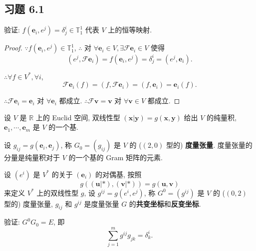\documentclass{ctexart}
\begin{document}
\subsection{习题 6.1}
\begin{exercise}%
    验证: $f(\boldsymbol{e}_i,e^j)=\delta_j^i\in\mathbb{T}_1^1$ 代表 $V$ 上的恒等映射.
\end{exercise}
\begin{proof}
    $\because f(\boldsymbol{e}_i,e^j)\in\mathbb{T}_1^1$, $\therefore$ 对 $\forall\boldsymbol{e}_i\in V,\exists\mathcal{F}\boldsymbol{e}_i\in V$ 使得
    \[(e^j,\mathcal{F}\boldsymbol{e}_i)=f(\boldsymbol{e}_i,e^j)=\delta_j^i=(e^j,\boldsymbol{e}_i).\]

    $\therefore\forall f\in V^*,\forall i$,
    \[\mathcal{F}\boldsymbol{e}_i(f)=(f,\mathcal{F}\boldsymbol{e}_i)=(f,\boldsymbol{e}_i)=\boldsymbol{e}_i(f).\]
    
    $\therefore\mathcal{F}\boldsymbol{e}_i=\boldsymbol{e}_i$ 对 $\forall\boldsymbol{e}_i$ 都成立. $\therefore\mathcal{F}\boldsymbol{v}=\boldsymbol{v}$ 对 $\forall\boldsymbol{v}\in V$ 都成立.
\end{proof}
\begin{exercise}\label{ex1.2}
    设 $V$ 是 $\mathbb{R}$ 上的 Euclid 空间, 双线性型 $(\boldsymbol{x}|\boldsymbol{y})=g(\boldsymbol{x},\boldsymbol{y})$ 给出 $V$ 的纯量积, $\boldsymbol{e}_1,\cdots,\boldsymbol{e}_m$ 是 $V$ 的一个基.

    设 $g_{ij}=g(\boldsymbol{e}_i,\boldsymbol{e}_j)$, 称 $G_0=(g_{ij})$ 是 $V$ 的 ($(2,0)$ 型的) \textbf{度量张量}. 度量张量的分量是纯量积对于 $V$ 的一个基的 Gram 矩阵的元素.

    设 $(e^i)$ 是 $V^*$ 的关于 $(\boldsymbol{e}_i)$ 的对偶基, 按照
    \[g((\boldsymbol{u}|*),(\boldsymbol{v}|*))=g(\boldsymbol{u},\boldsymbol{v})\]
    来定义 $V^*$ 上的双线性型 $g$, 设 $g^{ij}=g(e^i,e^j)$, 称 $G^0=(g^{ij})$ 是 $V$ 的 ($(0,2)$ 型的) 度量张量, $g_{ij}$ 和 $g^{ij}$ 是度量张量 $G$ 的\textbf{共变坐标}和\textbf{反变坐标}.

    验证: $G^0G_0=E$, 即
    \[\sum\limits_{j=1}^mg^{ij}g_{jk}=\delta_k^i.\]
\end{exercise}
\end{document}
